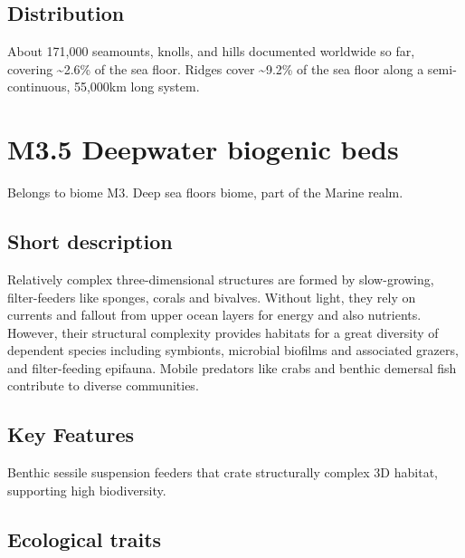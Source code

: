 \documentclass[
  letterpaper,
  DIV=11,
  numbers=noendperiod]{scrartcl}
\begin{document}
\subsection{Distribution}\label{distribution-43}

About 171,000 seamounts, knolls, and hills documented worldwide so far,
covering \textasciitilde2.6\% of the sea floor. Ridges cover
\textasciitilde9.2\% of the sea floor along a semi-continuous, 55,000km
long system.

\section{M3.5 Deepwater biogenic
beds}\label{m3.5-deepwater-biogenic-beds}

Belongs to biome M3. Deep sea floors biome, part of the Marine realm.

\subsection{Short description}\label{short-description-44}

Relatively complex three-dimensional structures are formed by
slow-growing, filter-feeders like sponges, corals and bivalves. Without
light, they rely on currents and fallout from upper ocean layers for
energy and also nutrients. However, their structural complexity provides
habitats for a great diversity of dependent species including symbionts,
microbial biofilms and associated grazers, and filter-feeding epifauna.
Mobile predators like crabs and benthic demersal fish contribute to
diverse communities.

\subsection{Key Features}\label{key-features-44}

Benthic sessile suspension feeders that crate structurally complex 3D
habitat, supporting high biodiversity.

\subsection{Ecological traits}\label{ecological-traits-44}
\end{document}
